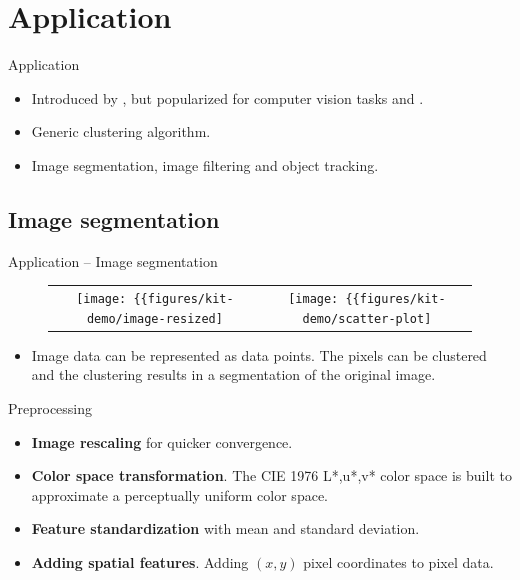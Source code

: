 \documentclass[18pt]{beamer}
\begin{document}
\section{Application}

\begin{frame}{Application}
	\begin{itemize}
		\item Introduced by \cite{Fukunaga.1975}, but popularized for computer vision tasks \cite{Comaniciu.2002} and \cite{Comaniciu.2003}.
	\end{itemize}

\begin{itemize}
	\item Generic clustering algorithm.
	\item Image segmentation, image filtering and object tracking.
\end{itemize}
\end{frame}


\subsection{Image segmentation}

\begin{frame}{Application -- Image segmentation}
\begin{figure}	
	\begin{tabular}{cc}
		\texttt{[image: \{\{figures/kit-demo/image-resized]}}} &
		\texttt{[image: \{\{figures/kit-demo/scatter-plot]}}}
	\end{tabular}
\end{figure}
\begin{itemize}
	\item Image data can be represented as data points. The pixels can be clustered and the clustering results in a segmentation of the original image.
\end{itemize}
\end{frame}

\begin{frame}{Preprocessing}
	\begin{itemize}
		\item \textbf{Image rescaling} for quicker convergence.
		\item \textbf{Color space transformation}. The CIE 1976 L*,u*,v* color space is built to approximate a perceptually uniform color space.
		\item \textbf{Feature standardization} with mean and standard deviation.
		\item \textbf{Adding spatial features}. Adding $(x, y)$ pixel coordinates to pixel data.
	\end{itemize}
\end{frame}
\end{document}
